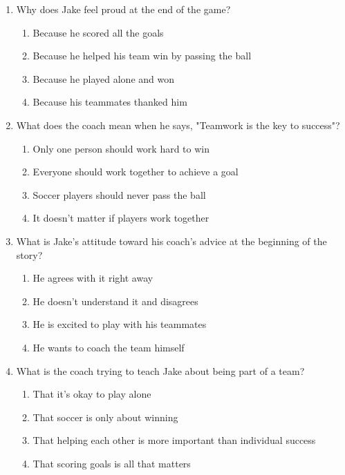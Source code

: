 \documentclass[12pt]{article}
\begin{document}
\begin{enumerate}
    \item Why does Jake feel proud at the end of the game?
    \begin{enumerate}[label=\Alph*.]
        \item Because he scored all the goals
        \item Because he helped his team win by passing the ball
        \item Because he played alone and won
        \item Because his teammates thanked him
    \end{enumerate}
    \vspace{0.5cm}

    \item What does the coach mean when he says, "Teamwork is the key to success"?
    \begin{enumerate}[label=\Alph*.]
        \item Only one person should work hard to win
        \item Everyone should work together to achieve a goal
        \item Soccer players should never pass the ball
        \item It doesn’t matter if players work together
    \end{enumerate}
    \vspace{0.5cm}

    \item What is Jake's attitude toward his coach’s advice at the beginning of the story?
    \begin{enumerate}[label=\Alph*.]
        \item He agrees with it right away
        \item He doesn't understand it and disagrees
        \item He is excited to play with his teammates
        \item He wants to coach the team himself
    \end{enumerate}
    \vspace{0.5cm}

    \item What is the coach trying to teach Jake about being part of a team?
    \begin{enumerate}[label=\Alph*.]
        \item That it’s okay to play alone
        \item That soccer is only about winning
        \item That helping each other is more important than individual success
        \item That scoring goals is all that matters
    \end{enumerate}
    \vspace{0.5cm}


\end{enumerate}
\end{document}
